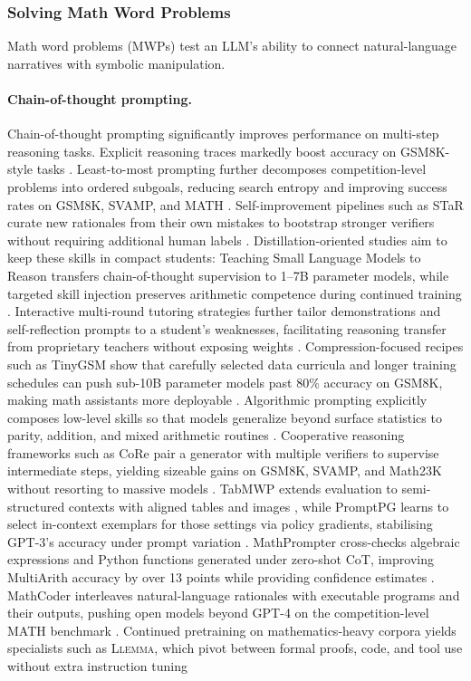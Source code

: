 \documentclass[acmsmall,anonymous]{acmart}
\begin{document}
\subsubsection{Solving Math Word Problems}\label{sec:mwp}
Math word problems (MWPs) test an LLM’s ability to connect natural-language narratives with symbolic manipulation.  

\paragraph{Chain-of-thought prompting.}
Chain-of-thought prompting significantly improves performance on multi-step reasoning tasks.
Explicit reasoning traces markedly boost accuracy on GSM8K-style tasks \cite{wei2022chain}.  Least-to-most prompting further decomposes competition-level problems into ordered subgoals, reducing search entropy and improving success rates on GSM8K, SVAMP, and MATH \cite{zhou-2023-least}.  Self-improvement pipelines such as STaR curate new rationales from their own mistakes to bootstrap stronger verifiers without requiring additional human labels \cite{zelikman-2022-star}.  Distillation-oriented studies aim to keep these skills in compact students: Teaching Small Language Models to Reason transfers chain-of-thought supervision to 1–7B parameter models, while targeted skill injection preserves arithmetic competence during continued training \cite{magister-2023-teaching,sharma-2022-skill-injection}.  Interactive multi-round tutoring strategies further tailor demonstrations and self-reflection prompts to a student's weaknesses, facilitating reasoning transfer from proprietary teachers without exposing weights \cite{wang-2023-tailored-learning}.  Compression-focused recipes such as TinyGSM show that carefully selected data curricula and longer training schedules can push sub-10B parameter models past 80\% accuracy on GSM8K, making math assistants more deployable \cite{liu-2023-tinygsm}.  Algorithmic prompting explicitly composes low-level skills so that models generalize beyond surface statistics to parity, addition, and mixed arithmetic routines \cite{zhou-2022-teaching-algorithmic}.  Cooperative reasoning frameworks such as CoRe pair a generator with multiple verifiers to supervise intermediate steps, yielding sizeable gains on GSM8K, SVAMP, and Math23K without resorting to massive models \cite{zhu-2023-core}.  TabMWP extends evaluation to semi-structured contexts with aligned tables and images \cite{lu-2022-tabmwp}, while PromptPG learns to select in-context exemplars for those settings via policy gradients, stabilising GPT-3's accuracy under prompt variation \cite{lu-2023-dynamic-prompt}.  MathPrompter cross-checks algebraic expressions and Python functions generated under zero-shot CoT, improving MultiArith accuracy by over 13 points while providing confidence estimates \cite{imani-2023-mathprompter}.  MathCoder interleaves natural-language rationales with executable programs and their outputs, pushing open models beyond GPT-4 on the competition-level MATH benchmark \cite{wang-2023-mathcoder}.  Continued pretraining on mathematics-heavy corpora yields specialists such as \textsc{Llemma}, which pivot between formal proofs, code, and tool use without extra instruction tuning 
\end{document}
